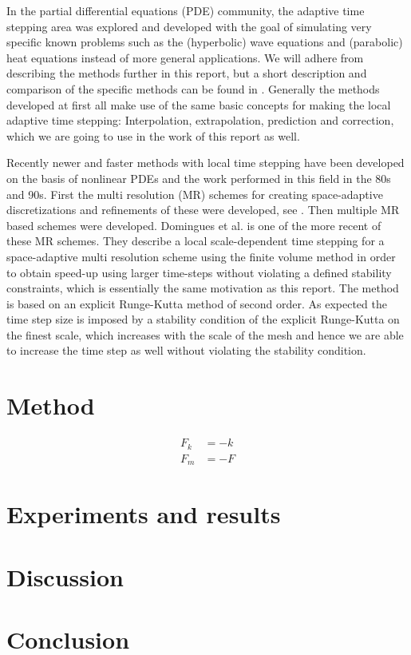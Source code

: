 \documentclass[11pt,a4paper]{article}
\begin{document}
In the partial differential equations (PDE) community, the adaptive time
stepping area was explored and developed with the goal of simulating
very specific known problems such as the (hyperbolic) wave equations
and (parabolic) heat equations instead of more general applications. We
will adhere from describing the methods further in this report, but a
short description and comparison of the specific methods can be found in
\cite{Gander:2013}. Generally the methods developed at first all make use
of the same basic concepts for making the local adaptive time stepping:
Interpolation, extrapolation, prediction and correction, which we are going to
use in the work of this report as well.

Recently newer and faster methods with local time stepping have been developed
on the basis of nonlinear PDEs and the work performed in this field in
the 80s and 90s. First the multi resolution (MR) schemes for creating
space-adaptive discretizations and refinements of these were developed, see
\cite{Berger:1984}. Then multiple MR based schemes were developed. Domingues
et al. \cite{Domingues:2008} is one of the more recent of these MR schemes.
They describe a local scale-dependent time stepping for a space-adaptive multi
resolution scheme using the finite volume method in order to obtain speed-up
using larger time-steps without violating a defined stability constraints,
which is essentially the same motivation as this report. The method is based
on an explicit Runge-Kutta method of second order. As expected the time step
size is imposed by a stability condition of the explicit Runge-Kutta on the
finest scale, which increases with the scale of the mesh and hence we are able
to increase the time step as well without violating the stability condition.

\section{Method}

\begin{align}
F_k &= -k \\
F_m &= -F
\end{align}

\section{Experiments and results}

\section{Discussion}

\section{Conclusion}


\cite{Keshav:2007}


\end{document}
